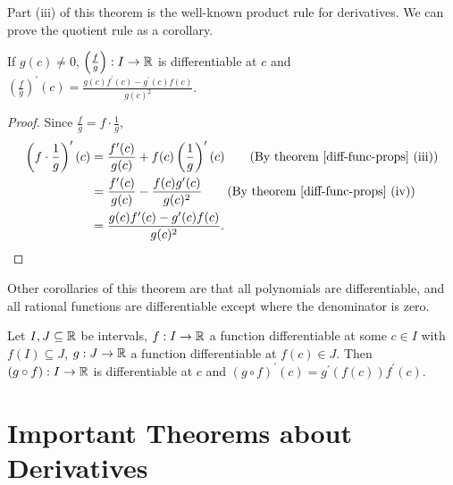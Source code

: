 \documentclass[../real_analysis.tex]{subfiles}
\begin{document}
        Part (iii) of this theorem is the well-known product rule for derivatives. We can prove the quotient rule as a corollary.
        \begin{corollary}
            If $g(c)\neq0$, $\left(\frac{f}{g}\right):I\to\mathbb{R}$ is differentiable at $c$ and ${\left(\frac{f}{g}\right)^\prime(c)=\frac{g(c)f^\prime(c)-g^\prime(c) f(c)}{g(c)^2}}$.
        \end{corollary}
        \begin{proof}
            Since $\frac{f}{g}=f\cdot\frac{1}{g}$,
            \begin{align*}
                \left(f\cdot\frac{1}{g}\right)^\prime(c)&=\frac{f^\prime(c)}{g(c)}+f(c)\left(\frac{1}{g}\right)^\prime(c)\tag{By theorem \ref{diff-func-props} (iii)}\\
                &=\frac{f^\prime(c)}{g(c)}-\frac{f(c)g^\prime(c)}{g(c)^2}\tag{By theorem \ref{diff-func-props} (iv)}\\
                &=\frac{g(c)f^\prime(c)-g^\prime(c)f(c)}{g(c)^2}.
            \end{align*}
        \end{proof}
        Other corollaries of this theorem are that all polynomials are differentiable, and all rational functions are differentiable except where the denominator is zero.
        \begin{theorem}
            Let $I,J\subseteq\mathbb{R}$ be intervals, $f:I\to\mathbb{R}$ a function differentiable at some $c\in I$ with $f(I)\subseteq J$, $g:J\to\mathbb{R}$ a function differentiable at $f(c)\in J$. Then $(g\circ f):I\to\mathbb{R}$ is differentiable at $c$ and $(g\circ f)^\prime(c)=g^\prime(f(c))f^\prime(c)$.
        \end{theorem}

    \section{Important Theorems about Derivatives}
\end{document}
